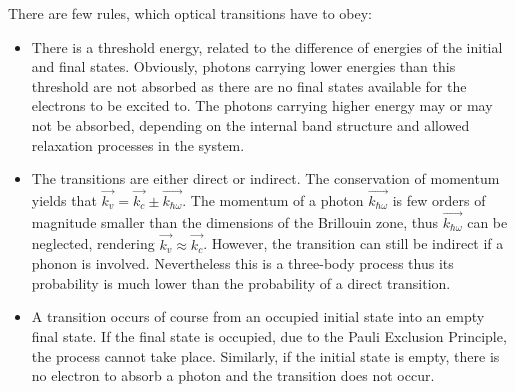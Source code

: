 \documentclass[titlepage,a4paper]{book}
\begin{document}
There are few rules, which optical transitions have to obey:
\begin{itemize}
\item There is a threshold energy, related to the difference of energies of the initial and final states. Obviously, photons carrying lower energies than this threshold are not absorbed as there are no final states available for the electrons to be excited to. The photons carrying higher energy may or may not be absorbed, depending on the internal band structure and allowed relaxation processes in the system.

\item The transitions are either direct or indirect. The conservation of momentum yields that $\vec{k_v} = \vec{k_c} \pm \vec{k_{\hbar\omega}}$. The momentum of a photon $\vec{k_{\hbar\omega}}$ is few orders of magnitude smaller than the dimensions of the Brillouin zone, thus $\vec{k_{\hbar\omega}}$ can be neglected, rendering  $\vec{k_v} \approx \vec{k_c}$. However, the transition can still be indirect if a phonon is involved. Nevertheless this is a three-body process thus its probability is much lower than the probability of a direct transition.

\item A transition occurs of course from an occupied initial state into an empty final state. If the final state is occupied, due to the Pauli Exclusion Principle, the process cannot take place. Similarly, if the initial state is empty, there is no electron to absorb a photon and the transition does not occur.

\end{itemize}

\end{document}
